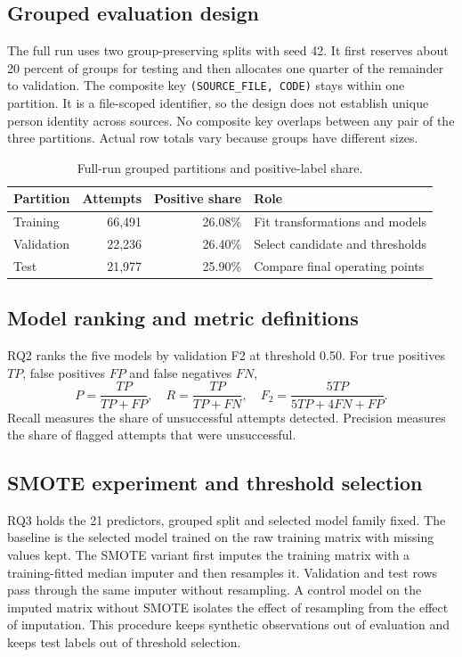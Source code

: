 \documentclass[runningheads]{llncs}
\begin{document}
\subsection{Grouped evaluation design}
The full run uses two group-preserving splits with seed 42. It first reserves about 20 percent of groups for testing and then allocates one quarter of the remainder to validation. The composite key \texttt{(SOURCE\_FILE, CODE)} stays within one partition. It is a file-scoped identifier, so the design does not establish unique person identity across sources. No composite key overlaps between any pair of the three partitions. Actual row totals vary because groups have different sizes.

\begin{table}[h]
\caption{Full-run grouped partitions and positive-label share.}
\label{tab:split}
\centering
\begin{tabular}{lrrl}
\toprule
Partition & Attempts & Positive share & Role \\
\midrule
Training & 66,491 & 26.08\% & Fit transformations and models \\
Validation & 22,236 & 26.40\% & Select candidate and thresholds \\
Test & 21,977 & 25.90\% & Compare final operating points \\
\bottomrule
\end{tabular}
\end{table}

\subsection{Model ranking and metric definitions}
RQ2 ranks the five models by validation F2 at threshold 0.50. For true positives $TP$, false positives $FP$ and false negatives $FN$,
\[
P=\frac{TP}{TP+FP},\quad R=\frac{TP}{TP+FN},\quad
F_2=\frac{5TP}{5TP+4FN+FP}.
\]
Recall measures the share of unsuccessful attempts detected. Precision measures the share of flagged attempts that were unsuccessful.

\subsection{SMOTE experiment and threshold selection}
RQ3 holds the 21 predictors, grouped split and selected model family fixed. The baseline is the selected model trained on the raw training matrix with missing values kept. The SMOTE variant first imputes the training matrix with a training-fitted median imputer and then resamples it. Validation and test rows pass through the same imputer without resampling. A control model on the imputed matrix without SMOTE isolates the effect of resampling from the effect of imputation. This procedure keeps synthetic observations out of evaluation and keeps test labels out of threshold selection.
\end{document}
